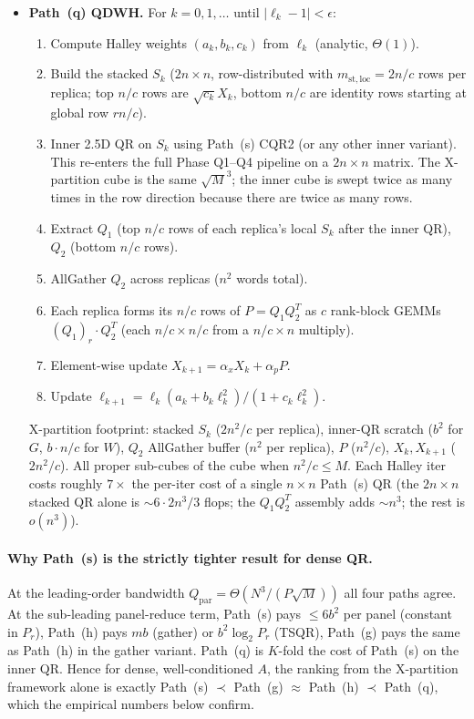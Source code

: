 \documentclass[11pt]{article}
\begin{document}
\begin{itemize}[leftmargin=2em, itemsep=0.4em]
\item \textbf{Path~(q) QDWH.}
  For $k = 0, 1, \dots$ until $|\ell_k - 1| < \epsilon$:
  \begin{enumerate}[leftmargin=1.5em, label=\textit{(\arabic*)}]
    \item Compute Halley weights $(a_k, b_k, c_k)$ from $\ell_k$
          (analytic, $\Theta(1)$).
    \item Build the stacked $S_k$ ($2n \times n$, row-distributed
          with $m_{\mathrm{st,loc}} = 2 n /c$ rows per replica; top
          $n/c$ rows are $\sqrt{c_k} X_k$, bottom $n/c$ are identity
          rows starting at global row $r n /c$).
    \item Inner 2.5D QR on $S_k$ using Path~(s) CQR2 (or any other
          inner variant).  This re-enters the full Phase Q1--Q4
          pipeline on a $2n \times n$ matrix.  The X-partition cube
          is the same $\sqrt{M}^3$; the inner cube is swept twice as
          many times in the row direction because there are twice as
          many rows.
    \item Extract $Q_1$ (top $n/c$ rows of each replica's local $S_k$
          after the inner QR), $Q_2$ (bottom $n/c$ rows).
    \item AllGather $Q_2$ across replicas ($n^2$ words total).
    \item Each replica forms its $n/c$ rows of $P = Q_1 Q_2^T$ as $c$
          rank-block GEMMs $(Q_1)_r \cdot Q_2^T$ (each
          $n/c \times n/c$ from a $n/c \times n$ multiply).
    \item Element-wise update $X_{k+1} = \alpha_x X_k + \alpha_p P$.
    \item Update $\ell_{k+1} = \ell_k (a_k + b_k \ell_k^2)/(1 + c_k \ell_k^2)$.
  \end{enumerate}
  X-partition footprint: stacked $S_k$ ($2 n^2 / c$ per replica),
  inner-QR scratch ($b^2$ for $G$, $b \cdot n / c$ for $W$),
  $Q_2$ AllGather buffer ($n^2$ per replica), $P$
  ($n^2 / c$), $X_k, X_{k+1}$ ($2 n^2 / c$). All proper sub-cubes of
  the cube when $n^2 / c \le M$.  Each Halley iter costs roughly
  $7 \times$ the per-iter cost of a single $n \times n$ Path~(s) QR
  (the $2n \times n$ stacked QR alone is $\sim 6 \cdot 2 n^3 / 3$
  flops; the $Q_1 Q_2^T$ assembly adds $\sim n^3$; the rest is
  $o(n^3)$).
\end{itemize}

\paragraph{Why Path~(s) is the strictly tighter result for dense QR.}
At the leading-order bandwidth $Q_{\text{par}} = \Theta(N^3 / (P \sqrt{M}))$
all four paths agree.  At the sub-leading panel-reduce term, Path~(s)
pays $\le 6 b^2$ per panel (constant in $P_r$), Path~(h) pays
$m b$ (gather) or $b^2 \log_2 P_r$ (TSQR), Path~(g) pays the same as
Path~(h) in the gather variant.  Path~(q) is $K$-fold the cost of
Path~(s) on the inner QR.  Hence for dense, well-conditioned $A$, the
ranking from the X-partition framework alone is exactly
Path~(s) $\prec$ Path~(g) $\approx$ Path~(h) $\prec$ Path~(q), which
the empirical numbers below confirm.
\end{document}
